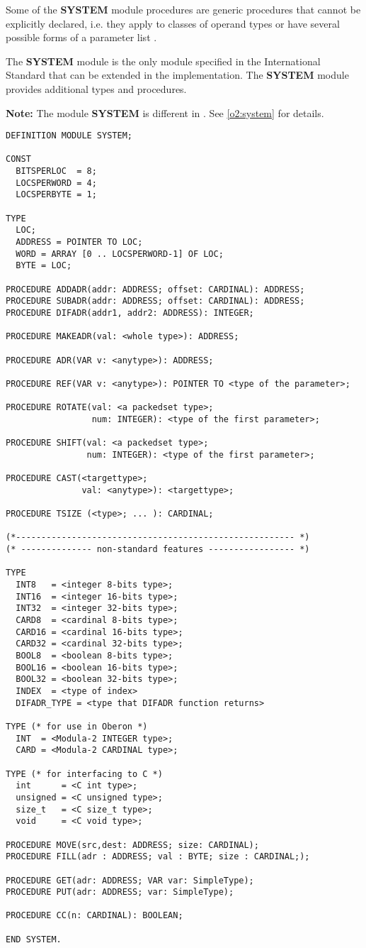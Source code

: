 Some of the {\bf SYSTEM} module procedures are generic procedures that
cannot be explicitly declared, i.e. they apply to classes of
operand types or have several possible forms of a parameter list .

The {\bf SYSTEM}  module is the only module specified in the
International  Standard  that  can  be  extended  in  the
implementation. The \XDS{} {\bf SYSTEM} module provides additional
types and procedures.

{\bf Note:} The module {\bf SYSTEM} is different in \ot{}.
See \ref{o2:system} for details.

{\small
\begin{verbatim}
DEFINITION MODULE SYSTEM;

CONST
  BITSPERLOC  = 8;
  LOCSPERWORD = 4;
  LOCSPERBYTE = 1;

TYPE
  LOC;
  ADDRESS = POINTER TO LOC;
  WORD = ARRAY [0 .. LOCSPERWORD-1] OF LOC;
  BYTE = LOC;

PROCEDURE ADDADR(addr: ADDRESS; offset: CARDINAL): ADDRESS;
PROCEDURE SUBADR(addr: ADDRESS; offset: CARDINAL): ADDRESS;
PROCEDURE DIFADR(addr1, addr2: ADDRESS): INTEGER;

PROCEDURE MAKEADR(val: <whole type>): ADDRESS;

PROCEDURE ADR(VAR v: <anytype>): ADDRESS;

PROCEDURE REF(VAR v: <anytype>): POINTER TO <type of the parameter>;

PROCEDURE ROTATE(val: <a packedset type>;
                 num: INTEGER): <type of the first parameter>;

PROCEDURE SHIFT(val: <a packedset type>;
                num: INTEGER): <type of the first parameter>;

PROCEDURE CAST(<targettype>;
               val: <anytype>): <targettype>;

PROCEDURE TSIZE (<type>; ... ): CARDINAL;

(*------------------------------------------------------- *)
(* -------------- non-standard features ----------------- *)

TYPE
  INT8   = <integer 8-bits type>;
  INT16  = <integer 16-bits type>;
  INT32  = <integer 32-bits type>;
  CARD8  = <cardinal 8-bits type>;
  CARD16 = <cardinal 16-bits type>;
  CARD32 = <cardinal 32-bits type>;
  BOOL8  = <boolean 8-bits type>;
  BOOL16 = <boolean 16-bits type>;
  BOOL32 = <boolean 32-bits type>;
  INDEX  = <type of index>
  DIFADR_TYPE = <type that DIFADR function returns>

TYPE (* for use in Oberon *)
  INT  = <Modula-2 INTEGER type>;
  CARD = <Modula-2 CARDINAL type>;

TYPE (* for interfacing to C *)
  int      = <C int type>;
  unsigned = <C unsigned type>;
  size_t   = <C size_t type>;
  void     = <C void type>;

PROCEDURE MOVE(src,dest: ADDRESS; size: CARDINAL);
PROCEDURE FILL(adr : ADDRESS; val : BYTE; size : CARDINAL;);

PROCEDURE GET(adr: ADDRESS; VAR var: SimpleType);
PROCEDURE PUT(adr: ADDRESS; var: SimpleType);

PROCEDURE CC(n: CARDINAL): BOOLEAN;

END SYSTEM.
\end{verbatim}
} %

